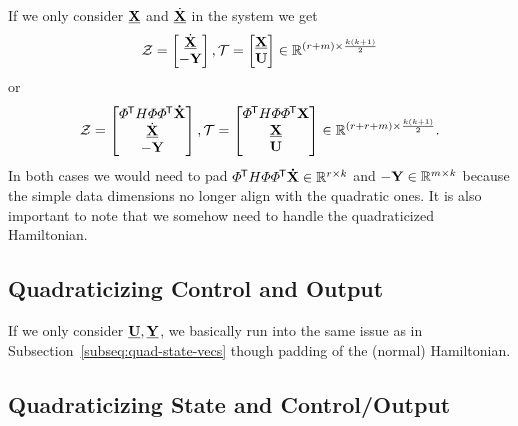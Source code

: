 If we only consider $\underline{\mathbf{X}}$ and $\underline{\dot{\mathbf{X}}}$ in the system we get
\begin{equation*}
    \mathcal{Z} =
    \begin{bmatrix}
        \underline{\dot{\mathbf{X}}} \\
        -\mathbf{Y}
    \end{bmatrix},
    \mathcal{T} =
    \begin{bmatrix}
        \underline{\mathbf{X}} \\
        \mathbf{U}
    \end{bmatrix} \in \mathbb{R}^{(r + m) \times \frac{k (k + 1)}{2}}
\end{equation*}
or
\begin{equation*}
    \mathcal{Z} =
    \begin{bmatrix}
        \varPhi^{\mkern-1.5mu \mathsf{T}} H \varPhi \varPhi^{\mkern-1.5mu \mathsf{T}} \mathbf{\dot{X}} \\
        \underline{\dot{\mathbf{X}}} \\
        -\mathbf{Y}
    \end{bmatrix},
    \mathcal{T} =
    \begin{bmatrix}
        \varPhi^{\mkern-1.5mu \mathsf{T}} H \varPhi \varPhi^{\mkern-1.5mu \mathsf{T}} \mathbf{X} \\
        \underline{\mathbf{X}} \\
        \mathbf{U}
    \end{bmatrix} \in \mathbb{R}^{(r + r + m) \times \frac{k (k + 1)}{2}}.
\end{equation*}
In both cases we would need to pad $\varPhi^{\mkern-1.5mu \mathsf{T}} H \varPhi \varPhi^{\mkern-1.5mu \mathsf{T}} \mathbf{\dot{X}} \in \mathbb{R}^{r \times k}$ and $-\mathbf{Y} \in \mathbb{R}^{m \times k}$ because the simple data dimensions no longer align with the quadratic ones.
It is also important to note that we somehow need to handle the quadraticized Hamiltonian.

\subsection{Quadraticizing Control and Output}

If we only consider $\underline{\mathbf{U}}, \underline{\mathbf{Y}}$, we basically run into the same issue as in Subsection~\ref{subseq:quad-state-vecs} though padding of the (normal) Hamiltonian.

\subsection{Quadraticizing State and Control/Output}

